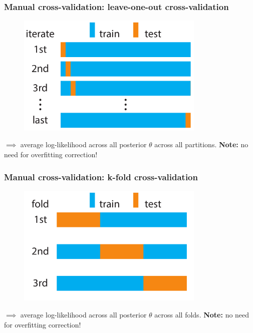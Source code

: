 \documentclass[handout]{beamer}
\begin{document}
\begin{frame}
	\frametitle{Manual cross-validation: leave-one-out cross-validation}
	
	\begin{figure}[ht]
		\centerline{\includegraphics[width=0.8\textwidth]{figures/lec7_testSet_loo.pdf}}
	\end{figure}
	
	$\implies$ average log-likelihood across all posterior $\theta$ across all partitions. \textbf{Note:} no need for overfitting correction!
	
\end{frame}

\begin{frame}
	\frametitle{Manual cross-validation: k-fold cross-validation}
	
	\begin{figure}[ht]
		\centerline{\includegraphics[width=0.8\textwidth]{figures/lec7_testSet_kFolds.pdf}}
	\end{figure}
	
	$\implies$ average log-likelihood across all posterior $\theta$ across all folds. \textbf{Note:} no need for overfitting correction!
	
\end{frame}
\end{document}
